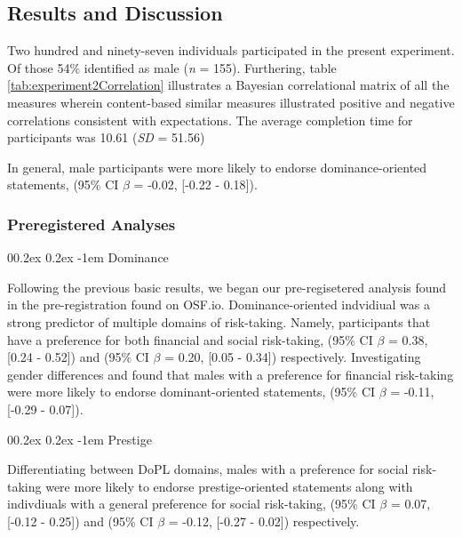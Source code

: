 \documentclass[
  donotrepeattitle,doc, 12pt, a4paper,floatsintext]{apa7}
\makeatletter
\let\oldparagraph\paragraph
\renewcommand{\paragraph}[1]{\oldparagraph{#1}\mbox{}}
\renewcommand{\paragraph}{\@startsection{paragraph}{4}{\parindent}%
  {0\baselineskip \@plus 0.2ex \@minus 0.2ex}%
  {-1em}%
  {\normalfont\normalsize\bfseries\itshape\typesectitle}}
\makeatother
\begin{document}
\hypertarget{results-and-discussion}{%
\subsection{Results and Discussion}\label{results-and-discussion}}

Two hundred and ninety-seven individuals participated in the present experiment. Of those 54\% identified as male (\emph{n} = 155). Furthering, table \ref{tab:experiment2Correlation} illustrates a Bayesian correlational matrix of all the measures wherein content-based similar measures illustrated positive and negative correlations consistent with expectations. The average completion time for participants was 10.61 (\emph{SD} = 51.56)

In general, male participants were more likely to endorse dominance-oriented statements, (95\% CI \(\beta\) = -0.02, {[}-0.22 - 0.18{]}).

\hypertarget{preregistered-analyses-1}{%
\subsubsection{Preregistered Analyses}\label{preregistered-analyses-1}}

\hypertarget{dominance-1}{%
\paragraph{Dominance}\label{dominance-1}}

Following the previous basic results, we began our pre-regisetered analysis found in the pre-registration found on OSF.io. Dominance-oriented indvidiual was a strong predictor of multiple domains of risk-taking. Namely, participants that have a preference for both financial and social risk-taking, (95\% CI \(\beta\) = 0.38, {[}0.24 - 0.52{]}) and (95\% CI \(\beta\) = 0.20, {[}0.05 - 0.34{]}) respectively. Investigating gender differences and found that males with a preference for financial risk-taking were more likely to endorse dominant-oriented statements, (95\% CI \(\beta\) = -0.11, {[}-0.29 - 0.07{]}).

\hypertarget{prestige-1}{%
\paragraph{Prestige}\label{prestige-1}}

Differentiating between DoPL domains, males with a preference for social risk-taking were more likely to endorse prestige-oriented statements along with indivdiuals with a general preference for social risk-taking, (95\% CI \(\beta\) = 0.07, {[}-0.12 - 0.25{]}) and (95\% CI \(\beta\) = -0.12, {[}-0.27 - 0.02{]}) respectively.
\end{document}
